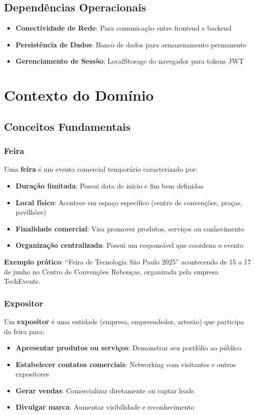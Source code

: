 \documentclass[12pt,a4paper]{article}
\begin{document}
\subsection{Dependências Operacionais}
\begin{itemize}
    \item \textbf{Conectividade de Rede}: Para comunicação entre frontend e backend
    \item \textbf{Persistência de Dados}: Banco de dados para armazenamento permanente
    \item \textbf{Gerenciamento de Sessão}: LocalStorage do navegador para tokens JWT
\end{itemize}

\section{Contexto do Domínio}

\subsection{Conceitos Fundamentais}

\subsubsection{Feira}
Uma \textbf{feira} é um evento comercial temporário caracterizado por:
\begin{itemize}
    \item \textbf{Duração limitada}: Possui data de início e fim bem definidas
    \item \textbf{Local físico}: Acontece em espaço específico (centro de convenções, praças, pavilhões)
    \item \textbf{Finalidade comercial}: Visa promover produtos, serviços ou conhecimento
    \item \textbf{Organização centralizada}: Possui um responsável que coordena o evento
\end{itemize}

\textbf{Exemplo prático}: ``Feira de Tecnologia São Paulo 2025'' acontecendo de 15 a 17 de junho no Centro de Convenções Rebouças, organizada pela empresa TechEvents.

\subsubsection{Expositor}
Um \textbf{expositor} é uma entidade (empresa, empreendedor, artesão) que participa da feira para:
\begin{itemize}
    \item \textbf{Apresentar produtos ou serviços}: Demonstrar seu portfólio ao público
    \item \textbf{Estabelecer contatos comerciais}: Networking com visitantes e outros expositores
    \item \textbf{Gerar vendas}: Comercializar diretamente ou captar leads
    \item \textbf{Divulgar marca}: Aumentar visibilidade e reconhecimento
\end{itemize}
\end{document}
